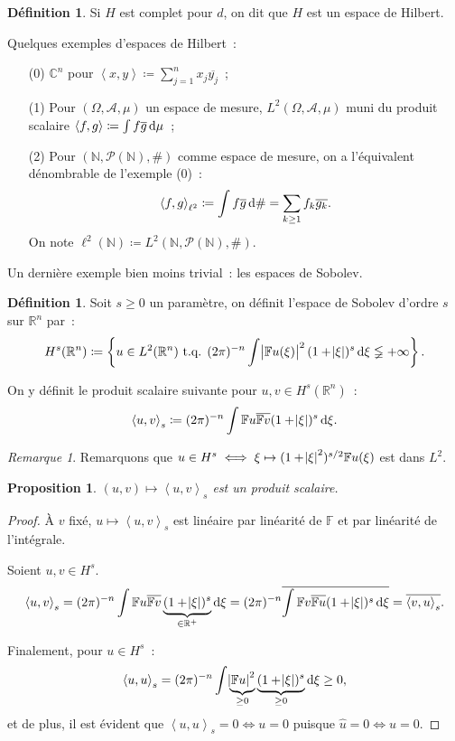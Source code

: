 \documentclass{report}
\newcommand{\C}{{\mathbb C}}
\newcommand{\R}{{\mathbb R}}
\newcommand{\N}{{\mathbb N}}
\newcommand{\scpr}[2]{\left\langle#1, #2\right\rangle}
\newcommand{\tq}{\text{ t.q. }}
\newcommand{\pinfty}{{+\infty}}
\newtheorem{prp}[thm]{Proposition}
\theoremstyle{definition}
\newtheorem{déf}[thm]{Définition}
\theoremstyle{remark}
\newtheorem*{rmq}{Remarque}
\begin{document}
\begin{déf} Si $H$ est complet pour $d$, on dit que $H$ est un espace de Hilbert.
\end{déf}

Quelques exemples d'espaces de Hilbert~:
\begin{itemize}
	\item[(0)] $\C^n$ pour $\scpr xy \coloneqq \sum_{j=1}^nx_j\overline {y_j}$~;
	\item[(1)] Pour $(\Omega, \mathcal A, \mu)$ un espace de mesure, $L^2(\Omega, \mathcal A, \mu)$ muni du produit scalaire $\scpr fg \coloneqq \int f\overline g\dif\mu$~;
	\item[(2)] Pour $(\N, \mathcal P(\N), \#)$ comme espace de mesure, on a l'équivalent dénombrable de l'exemple (0)~:
	\[\scpr fg_{\ell^2} \coloneqq \int f\overline g\dif\# = \sum_{k \geq 1}f_k\overline {g_k}.\]
	On note $\ell^2(\N) \coloneqq L^2(\N, \mathcal P(\N), \#)$.
\end{itemize}

Un dernière exemple bien moins trivial~: les espaces de Sobolev.

\begin{déf} Soit $s \geq 0$ un paramètre, on définit l'espace de Sobolev d'ordre $s$ sur $\R^n$ par~:
\begin{equation}
	H^s(\R^n) \coloneqq \left\{u \in L^2(\R^n) \tq (2\pi)^{-n}\int \abs {\mathbb Fu(\xi)}^2(1+\abs \xi)^s\dif\xi \lneqq \pinfty\right\}.
\end{equation}

On y définit le produit scalaire suivante pour $u, v \in H^s(\R^n)$~:
\begin{equation}
	\scpr uv_s \coloneqq (2\pi)^{-n}\int\mathbb Fu\overline {\mathbb Fv}(1+\abs\xi)^s\dif\xi.
\end{equation}
\end{déf}

\begin{rmq} Remarquons que $u \in H^s \iff \xi \mapsto (1+\abs \xi^2)^{s/2}\mathbb Fu(\xi)$ est dans $L^2$.
\end{rmq}

\begin{prp} $(u, v) \mapsto \scpr uv_s$ est un produit scalaire.
\end{prp}

\begin{proof} À $v$ fixé, $u \mapsto \scpr uv_s$ est linéaire par linéarité de $\mathbb F$ et par linéarité de l'intégrale.

Soient $u, v \in H^s$.
\[\scpr uv_s = (2\pi)^{-n}\int \mathbb Fu\overline {\mathbb Fv}\underbrace {(1+\abs \xi)^s}_{\in \R^+}\dif\xi
	= (2\pi)^{-n}\overline {\int \mathbb Fv\overline {\mathbb Fu}(1+\abs \xi)^s\dif\xi} = \overline {\scpr vu_s}.\]

Finalement, pour $u \in H^s$~:
\[\scpr uu_s = (2\pi)^{-n}\int\underbrace {\abs {\mathbb Fu}^2}_{\geq 0}\underbrace {(1+\abs\xi)^s}_{\geq 0}\dif\xi \geq 0,\]
et de plus, il est évident que $\scpr uu_s = 0 \iff u = 0$ puisque $\hat u = 0 \iff u = 0$.
\end{proof}
\end{document}

